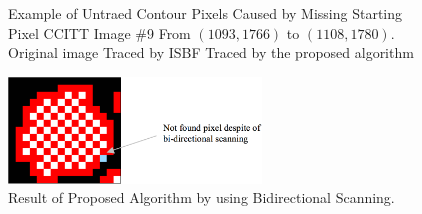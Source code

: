 \begin{figure}[htbp]
	\centering
	 
	\caption{Example of Untraed Contour Pixels Caused by Missing Starting Pixel CCITT Image \#9 From $(1093, 1766)$ to $(1108, 1780)$. \protect{} Original image \protect{} Traced by ISBF \protect{} Traced by the proposed algorithm}
	\label{fig:image21}
\end{figure}

\begin{figure}[htbp]
	\centering
	\includegraphics[width=0.6\textwidth]{5.ExperimentalResult/fig22.png}
	\caption{Result of Proposed Algorithm by using Bidirectional Scanning.}
	\label{fig:image22}
\end{figure}

